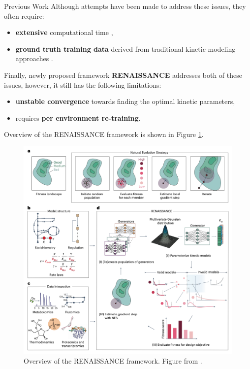 \documentclass[final]{beamer}
\newlength{\colwidth}
\begin{document}
\begin{frame}[t]
\begin{columns}[t]
\begin{column}{\colwidth}
\begin{block}{Previous Work}
        Although attempts have been made to address these issues, they often require:
        \begin{itemize}
            \item \textbf{extensive} computational time \cite{kfit},
            \item \textbf{ground truth training data} derived from traditional kinetic modeling approaches \cite{ischrunk,miskovic2019uncertainty,gans}.
        \end{itemize}
    Finally, newly proposed framework \textbf{RENAISSANCE} \cite{rennaissance} addresses both of these issues,
    however, it still has the following limitations:
    \begin{itemize}
        \item \textbf{unstable convergence} towards finding the optimal kinetic parameters,
        \item requires \textbf{ per environment re-training}.
    \end{itemize}

    Overview of the RENAISSANCE framework is shown in Figure \ref{fig:renaissance}.
    \vspace{0.5cm}

    \begin{figure}[h]
        \centering
        \includegraphics[width=1.0\textwidth]{assets/renaissance.png}
        \caption{Overview of the RENAISSANCE framework. Figure from \cite{rennaissance}.}
        \label{fig:renaissance}
    \end{figure}



\end{block}
\end{column}
\end{columns}
\end{frame}
\end{document}
